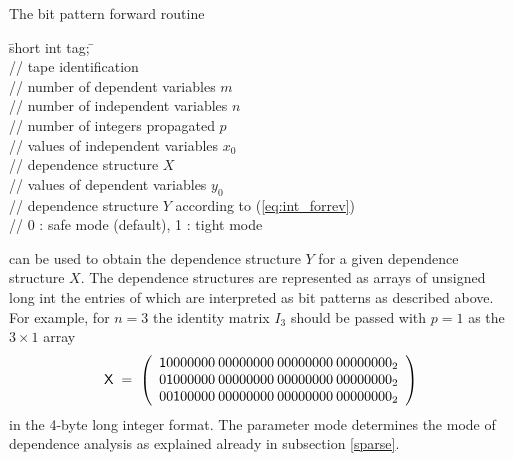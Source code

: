 \documentclass[11pt,twoside]{article}
\begin{document}
The bit pattern {\sf forward} routine 
%
\begin{tabbing}
\hspace{0.5in}\={\sf short int tag;} \hspace{1.1in}\= \kill    %
\\
              \> // tape identification \\
                      \> // number of dependent variables $m$\\
                      \> // number of independent variables $n$\\
                      \> // number of integers propagated $p$\\
                \> // values of independent variables $x_0$\\
  \> // dependence structure $X$ \\
                \> // values of dependent variables $y_0$\\
  \> // dependence structure $Y$ according to 
                                     (\ref{eq:int_forrev})\\
                  \> // 0 : safe mode (default), 1 : tight mode
\end{tabbing}
%
can be used to obtain the dependence structure $Y$ for a given dependence structure
$X$. The dependence structures are
represented as arrays of {\sf unsigned long int} the entries of which are
interpreted as bit patterns as described above.   
For example, for $n=3$ the identity matrix $I_3$ should be passed
with $p=1$ as the $3 \times 1$ array
\begin{eqnarray*}
{\sf X} \; = \;
\left( \begin{array}{r}
         {\sf 1}0000000 \: 00000000 \: 00000000 \: 00000000_2 \\
         0{\sf 1}000000 \: 00000000 \: 00000000 \: 00000000_2 \\
         00{\sf 1}00000 \: 00000000 \: 00000000 \: 00000000_2
       \end{array} \right)
\end{eqnarray*}
in the 4-byte long integer format. The parameter {\sf mode} determines
the mode of dependence analysis as explained already in subsection \ref{sparse}.
\end{document}
